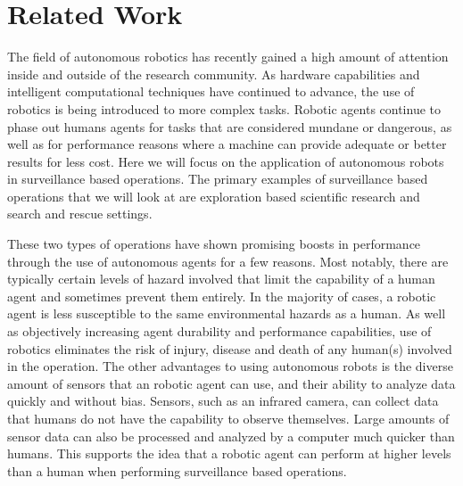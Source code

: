 

\chapter{Related Work}
The field of autonomous robotics has recently gained a high amount of attention inside and outside of the research community.
As hardware capabilities and intelligent computational techniques have continued to advance, the use of robotics is being introduced to more complex tasks.
Robotic agents continue to phase out humans agents for tasks that are considered mundane or dangerous, as well as for performance reasons where a machine can provide adequate or better results for less cost.
Here we will focus on the application of autonomous robots in surveillance based operations.
The primary examples of surveillance based operations that we will look at are exploration based scientific research and search and rescue settings.

These two types of operations have shown promising boosts in performance through the use of autonomous agents for a few reasons.
Most notably, there are typically certain levels of hazard involved that limit the capability of a human agent and sometimes prevent them entirely.
In the majority of cases, a robotic agent is less susceptible to the same environmental hazards as a human.
As well as objectively increasing agent durability and performance capabilities, use of robotics eliminates the risk of injury, disease and death of any human(s) involved in the operation.
The other advantages to using autonomous robots is the diverse amount of sensors that an robotic agent can use, and their ability to analyze data quickly and without bias.
Sensors, such as an infrared camera, can collect data that humans do not have the capability to observe themselves.
Large amounts of sensor data can also be processed and analyzed by a computer much quicker than humans.
This supports the idea that a robotic agent can perform at higher levels than a human when performing surveillance based operations.

